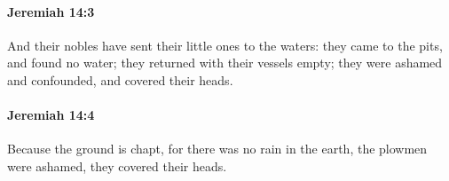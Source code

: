 		\paragraph{Jeremiah 14:3} %
			\label{JEREMIAH-14-3}

			And their nobles have sent their little ones to the waters: they came to the pits, and found no water; they returned with their vessels empty; they were ashamed and confounded, and covered their heads.


		\paragraph{Jeremiah 14:4} %
			\label{JEREMIAH-14-4}

			Because the ground is chapt, for there was no rain in the earth, the plowmen were ashamed, they covered their heads.


